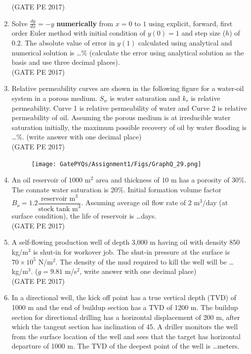 \documentclass[journal,12pt,onecolumn]{IEEEtran}
\theoremstyle{remark}
\begin{document}
\begin{enumerate}
\hfill{(GATE PE 2017)}

\item Solve $ \frac{dy}{dx} = -y$ \textbf{numerically} from $x = 0$ to $1$ using explicit, forward, first order Euler method with initial condition of $y(0) = 1$ and step size ($h$) of 0.2. The absolute value of error in $y(1)$ calculated using analytical and numerical solution is \dots \% (calculate the error using analytical solution as the basis and use three decimal places).\\

\hfill{(GATE PE 2017)}

\item Relative permeability curves are shown in the following figure for a water-oil system in a porous medium. $S_w$ is water saturation and $k_r$ is relative permeability. Curve 1 is relative permeability of water and Curve 2 is relative permeability of oil.
Assuming the porous medium is at irreducible water saturation initially, the maximum possible recovery of oil by water flooding is \dots \%. (write answer with one decimal place)\\

\hfill{(GATE PE 2017)}
\begin{figure}[h]
    \centering
    \texttt{[image: GatePYQs/Assignment1/Figs/GraphQ\_29.png]}
\end{figure}

\item An oil reservoir of $1000$ m$^2$ area and thickness of $10$ m has a porosity of 30\%. The connate water saturation is 20\%. Initial formation volume factor $B_o = 1.2 \dfrac{\text{reservoir m}^3}{\text{stock tank m}^3}$. Assuming average oil flow rate of 2 m$^3$/day (at surface condition), the life of reservoir is \dots days.\\

\hfill{(GATE PE 2017)}

\item A self-flowing production well of depth 3,000 m having oil with density 850 kg/m$^3$ is shut-in for workover job. The shut-in pressure at the surface is $70 \times 10^5$ N/m$^2$. The density of the mud required to kill the well will be \dots kg/m$^3$. ($g = 9.81$ m/s$^2$, write answer with one decimal place)\\

\hfill{(GATE PE 2017)}

\item In a directional well, the kick off point has a true vertical depth (TVD) of 1000 m and the end of buildup section has a TVD of 1200 m. The buildup section for directional drilling has a horizontal displacement of 200 m, after which the tangent section has inclination of 45\degree.
A driller monitors the well from the surface location of the well and sees that the target has horizontal departure of 1000 m. The TVD of the deepest point of the well is \dots meters.\\


\end{enumerate}
\end{document}
